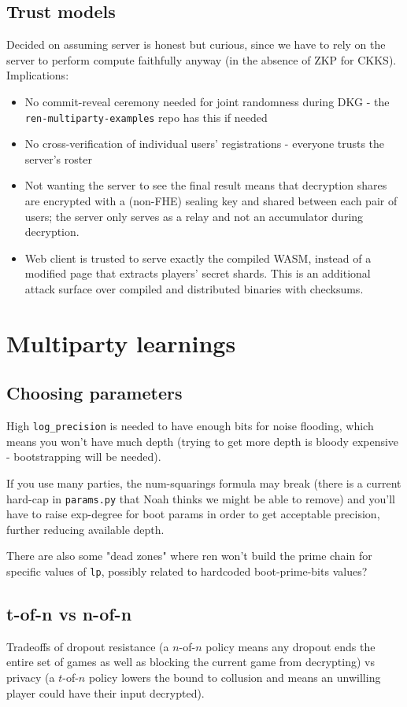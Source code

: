 \documentclass{article}
\begin{document}
\subsection{Trust models}
Decided on assuming server is honest but curious, since we have to rely on the server to perform compute faithfully anyway (in the absence of ZKP for CKKS). 
Implications:
\begin{itemize}
    \item No commit-reveal ceremony needed for joint randomness during DKG - the \verb|ren-multiparty-examples| repo has this if needed
    \item No cross-verification of individual users' registrations - everyone trusts the server's roster
    \item Not wanting the server to see the final result means that decryption shares are encrypted with a (non-FHE) sealing key and shared between each pair of users; the server only serves as a relay and not an accumulator during decryption.
    \item Web client is trusted to serve exactly the compiled WASM, instead of a modified page that extracts players' secret shards.
    This is an additional attack surface over compiled and distributed binaries with checksums.
\end{itemize}

\section{Multiparty learnings}
\subsection{Choosing parameters}
High \verb|log_precision| is needed to have enough bits for noise flooding, which means you won't have much depth (trying to get more depth is bloody expensive - bootstrapping will be needed).

If you use many parties, the num-squarings formula may break (there is a current hard-cap in \verb|params.py| that Noah thinks we might be able to remove) and you'll have to raise exp-degree for boot params in order to get acceptable precision, further reducing available depth.

There are also some "dead zones" where ren won't build the prime chain for specific values of \verb|lp|, possibly related to hardcoded boot-prime-bits values?

\subsection{t-of-n vs n-of-n}
Tradeoffs of dropout resistance (a $n$-of-$n$ policy means any dropout ends the entire set of games as well as blocking the current game from decrypting) vs privacy (a $t$-of-$n$ policy lowers the bound to collusion and means an unwilling player could have their input decrypted).
\end{document}
